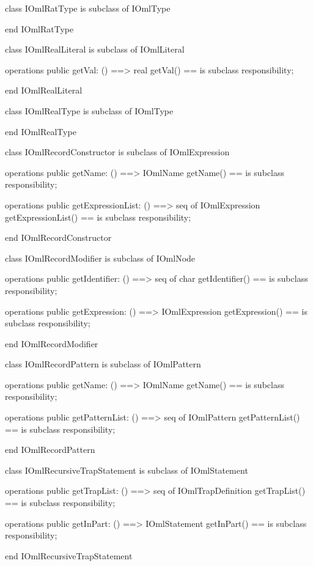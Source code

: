 \begin{vdm_al}
class IOmlRatType
 is subclass of IOmlType

end IOmlRatType
\end{vdm_al}

\begin{vdm_al}
class IOmlRealLiteral
 is subclass of IOmlLiteral

operations
  public getVal: () ==> real
  getVal() == is subclass responsibility;

end IOmlRealLiteral
\end{vdm_al}

\begin{vdm_al}
class IOmlRealType
 is subclass of IOmlType

end IOmlRealType
\end{vdm_al}

\begin{vdm_al}
class IOmlRecordConstructor
 is subclass of IOmlExpression

operations
  public getName: () ==> IOmlName
  getName() == is subclass responsibility;

operations
  public getExpressionList: () ==> seq of IOmlExpression
  getExpressionList() == is subclass responsibility;

end IOmlRecordConstructor
\end{vdm_al}

\begin{vdm_al}
class IOmlRecordModifier
 is subclass of IOmlNode

operations
  public getIdentifier: () ==> seq of char
  getIdentifier() == is subclass responsibility;

operations
  public getExpression: () ==> IOmlExpression
  getExpression() == is subclass responsibility;

end IOmlRecordModifier
\end{vdm_al}

\begin{vdm_al}
class IOmlRecordPattern
 is subclass of IOmlPattern

operations
  public getName: () ==> IOmlName
  getName() == is subclass responsibility;

operations
  public getPatternList: () ==> seq of IOmlPattern
  getPatternList() == is subclass responsibility;

end IOmlRecordPattern
\end{vdm_al}

\begin{vdm_al}
class IOmlRecursiveTrapStatement
 is subclass of IOmlStatement

operations
  public getTrapList: () ==> seq of IOmlTrapDefinition
  getTrapList() == is subclass responsibility;

operations
  public getInPart: () ==> IOmlStatement
  getInPart() == is subclass responsibility;

end IOmlRecursiveTrapStatement
\end{vdm_al}

